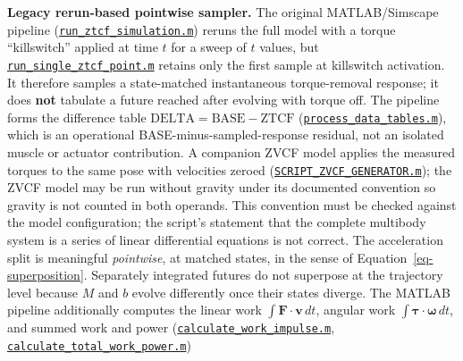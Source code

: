 \documentclass[
  letterpaper,
]{report}
\begin{document}
\textbf{Legacy rerun-based pointwise sampler.} The original
MATLAB/Simscape pipeline
(\href{https://github.com/D-sorganization/UpstreamDrift/blob/main/src/engines/Simscape_Multibody_Models/2D_Golf_Model/matlab_optimized/core/simulation/run_ztcf_simulation.m}{\texttt{run\_ztcf\_simulation.m}})
reruns the full model with a torque ``killswitch'' applied at time \(t\)
for a sweep of \(t\) values, but
\href{https://github.com/D-sorganization/UpstreamDrift/blob/main/src/engines/Simscape_Multibody_Models/2D_Golf_Model/matlab_optimized/core/simulation/run_single_ztcf_point.m}{\texttt{run\_single\_ztcf\_point.m}}
retains only the first sample at killswitch activation. It therefore
samples a state-matched instantaneous torque-removal response; it does
\textbf{not} tabulate a future reached after evolving with torque off.
The pipeline forms the difference table
\(\mathrm{DELTA} = \mathrm{BASE} - \mathrm{ZTCF}\)
(\href{https://github.com/D-sorganization/UpstreamDrift/blob/main/src/engines/Simscape_Multibody_Models/2D_Golf_Model/matlab_optimized/core/processing/process_data_tables.m}{\texttt{process\_data\_tables.m}}),
which is an operational BASE-minus-sampled-response residual, not an
isolated muscle or actuator contribution. A companion ZVCF model applies
the measured torques to the same pose with velocities zeroed
(\href{https://github.com/D-sorganization/UpstreamDrift/blob/main/src/engines/Simscape_Multibody_Models/2D_Golf_Model/matlab/Model\%20Output/Scripts/SCRIPT_ZVCF_GENERATOR.m}{\texttt{SCRIPT\_ZVCF\_GENERATOR.m}});
the ZVCF model may be run without gravity under its documented
convention so gravity is not counted in both operands. This convention
must be checked against the model configuration; the script's statement
that the complete multibody system is a series of linear differential
equations is not correct. The acceleration split is meaningful
\emph{pointwise}, at matched states, in the sense of
Equation~\ref{eq-superposition}. Separately integrated futures do not
superpose at the trajectory level because \(M\) and \(b\) evolve
differently once their states diverge. The MATLAB pipeline additionally
computes the linear work \(\int \mathbf F\cdot\mathbf v\,dt\), angular
work \(\int \boldsymbol\tau\cdot\boldsymbol\omega\,dt\), and summed work
and power
(\href{https://github.com/D-sorganization/UpstreamDrift/blob/main/src/engines/Simscape_Multibody_Models/2D_Golf_Model/matlab_optimized/core/processing/calculate_work_impulse.m}{\texttt{calculate\_work\_impulse.m}},
\href{https://github.com/D-sorganization/UpstreamDrift/blob/main/src/engines/Simscape_Multibody_Models/2D_Golf_Model/matlab_optimized/core/processing/calculate_total_work_power.m}{\texttt{calculate\_total\_work\_power.m}})
\end{document}
